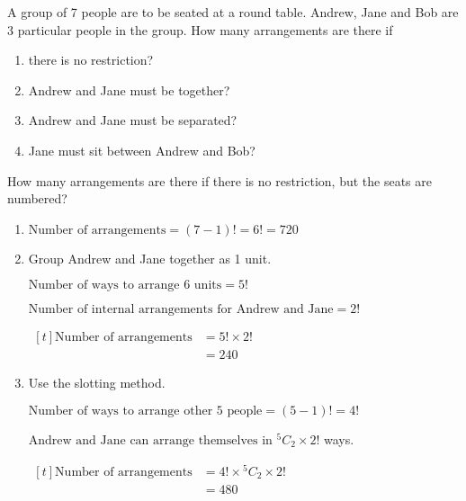 \documentclass[11pt,a4paper]{book}
\begin{document}
\begin{example}

A group of 7 people are to be seated at a round table. Andrew, Jane and Bob are 3 particular people in the group. How many arrangements are there if

\begin{enumerate}[label=(\alph*)]

\item there is no restriction?

\item Andrew and Jane must be together?

\item Andrew and Jane must be separated?

\item Jane must sit between Andrew and Bob?

\end{enumerate}

How many arrangements are there if there is no restriction, but the
seats are numbered?

\Solution

\begin{enumerate}[label=(\alph*)]

\item  $\text{Number of arrangements}=\left(7-1\right)!=6!=720$

\item  Group Andrew and Jane together as 1 unit.

$\text{Number of ways to arrange 6 units}=5!$

$\text{Number of internal arrangements for Andrew and Jane}=2!$

$
\begin{aligned}[t]
\text{Number of arrangements} & =5!\times2!\\
 & =240
\end{aligned}
$

\item \begin{minipage}[t]{.6\textwidth}

Use the slotting method.

$\text{Number of ways to arrange other 5 people}=\left(5-1\right)!=4!$

$\text{Andrew and Jane can arrange themselves in }{}^{5}C_{2}\times2!$ ways.

$
\begin{aligned}[t]
\text{Number of arrangements} & =4!\times{}^{5}C_{2}\times2!\\
 & =480
\end{aligned}
$


\end{minipage}
\end{enumerate}
\end{example}
\end{document}
